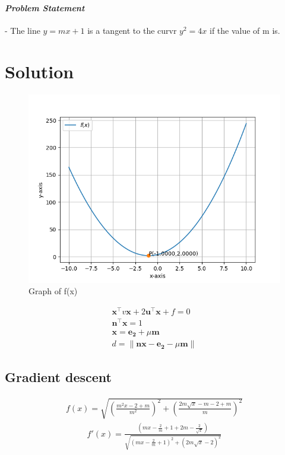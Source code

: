 \documentclass[10pt, a4paper]{article}
\title{\mytitle}
\author{\myauthor\hspace{1em}\\\contact\\IITH\hspace{0.5em}-\hspace{0.5em}\mymodule}
\date{}
\let\vec\mathbf
\begin{document}
	\maketitle
\paragraph{\textit{Problem Statement}}- The line $y=mx+1$ is a tangent to the curvr $y^2=4x$ if the value of m is.

\section*{\large Solution}
\begin{figure}[H]
\centering
\includegraphics[width=1\columnwidth]{Figure1.png}
\caption{Graph of f(x)}
\label{fig:triangle}
\end{figure}

\begin{align}
\vec{x}^{\top}v\vec{x}+2\vec{u}^{\top}\vec{x}+f=0\\
\vec{n}^{\top}\vec{x}=1\\
\vec{x}=\vec{e_2}+\mu\vec{m}\\
d=\|\vec{n}\vec{x}-\vec{e_2}-{\mu}\vec{m}\|
\end{align}
    \subsection*{\normalsize Gradient descent}
    
    
    \begin{align}
	\label{eq:vol_varx}
	f(x) =\sqrt{\left(\frac{m^2x-2+m}{m^2}\right)^2+\left(\frac{2m\sqrt{x}-m-2+m}{m}\right)^2}
\end{align}
\begin{align}   
    f'(x) = \frac{(mx-\frac{2}{m}+1+2m-\frac{2}{\sqrt{x}})}{\sqrt{(mx-\frac{2}{m}+1)^2+(2m\sqrt{x}-2)^2}}
	\end{align}
\end{document}
